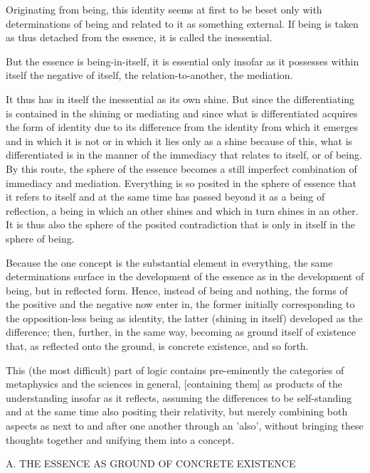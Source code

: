 Originating from being, this identity seems at first to be beset only with
determinations of being and related to it as something external.
If being is taken as thus detached from the essence,
it is called the inessential.

But the essence is being-in-itself, it is essential only insofar as
it possesses within itself the negative of itself,
the relation-to-another, the mediation.

It thus has in itself the inessential as its own shine.
But since the differentiating is contained in the shining or mediating
and since what is differentiated acquires the form of identity due to
its difference from the identity from which it emerges and in which it is not
or in which it lies only as a shine because of this,
what is differentiated is in the manner of
the immediacy that relates to itself, or of being.
By this route, the sphere of the essence becomes a
still imperfect combination of immediacy and mediation.
Everything is so posited in the sphere of essence
that it refers to itself and at the same time
has passed beyond it as a being of reflection,
a being in which an other shines and which in turn shines in an other.
It is thus also the sphere of the posited contradiction
that is only in itself in the sphere of being.

    Because the one concept is the substantial element in everything,
    the same determinations surface in the development of the essence
    as in the development of being, but in reflected form.
    Hence, instead of being and nothing,
    the forms of the positive and the negative now enter in,
    the former initially corresponding to
    the opposition-less being as identity,
    the latter (shining in itself) developed as the difference;
    then, further, in the same way,
    becoming as ground itself of existence that,
    as reflected onto the ground, is concrete existence, and so forth.

    This (the most difficult) part of logic contains pre-eminently
    the categories of metaphysics and the sciences in general,
    [containing them] as products of the understanding insofar as it reflects,
    assuming the differences to be self-standing and
    at the same time also positing their relativity,
    but merely combining both aspects as next to
    and after one another through an 'also',
    without bringing these thoughts together
    and unifying them into a concept.

A. THE ESSENCE AS GROUND OF CONCRETE EXISTENCE

